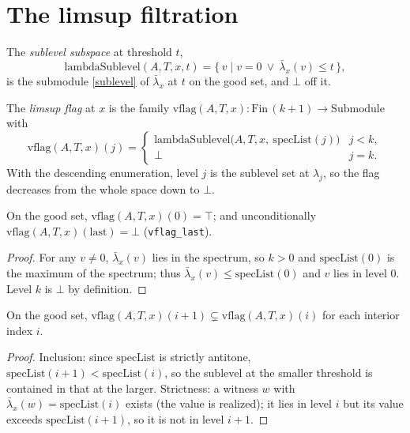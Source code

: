 \section{The limsup filtration}

\begin{definition}\label{lambdaSublevel}
  \leanok
  The \emph{sublevel subspace} at threshold $t$,
  \[ \mathrm{lambdaSublevel}(A,T,x,t)
     = \{\, v \mid v=0 \ \lor\ \bar\lambda_x(v)\le t \,\}, \]
  is the submodule \ref{sublevel} of $\bar\lambda_x$ at $t$ on the good set, and
  $\bot$ off it.
\end{definition}

\begin{definition}\label{vflag}
  \leanok
  The \emph{limsup flag} at $x$ is the family
  $\mathrm{vflag}(A,T,x)\colon\mathrm{Fin}\,(k+1)\to\mathrm{Submodule}$ with
  \[ \mathrm{vflag}(A,T,x)(j)
     = \begin{cases}
        \mathrm{lambdaSublevel}\bigl(A,T,x,\ \mathrm{specList}(j)\bigr) & j<k,\\
        \bot & j=k.
       \end{cases} \]
  With the descending enumeration, level $j$ is the sublevel set at $\lambda_j$,
  so the flag decreases from the whole space down to $\bot$.
\end{definition}

\begin{lemma}\label{vflag_zero}
  \leanok
  On the good set, $\mathrm{vflag}(A,T,x)(0)=\top$; and unconditionally
  $\mathrm{vflag}(A,T,x)(\mathrm{last})=\bot$ (\texttt{vflag\_last}).
  \begin{proof}\leanok
  For any $v\neq 0$, $\bar\lambda_x(v)$ lies in the spectrum, so $k>0$ and
  $\mathrm{specList}(0)$ is the maximum of the spectrum; thus
  $\bar\lambda_x(v)\le\mathrm{specList}(0)$ and $v$ lies in level $0$. Level $k$
  is $\bot$ by definition.
  \end{proof}
\end{lemma}

\begin{theorem}\label{vflag_strictAnti}
  \leanok
  On the good set, $\mathrm{vflag}(A,T,x)(i{+}1) \subsetneq
  \mathrm{vflag}(A,T,x)(i)$ for each interior index $i$.
  \begin{proof}\leanok
  Inclusion: since $\mathrm{specList}$ is strictly antitone,
  $\mathrm{specList}(i{+}1)<\mathrm{specList}(i)$, so the sublevel at the smaller
  threshold is contained in that at the larger. Strictness: a witness $w$ with
  $\bar\lambda_x(w)=\mathrm{specList}(i)$ exists (the value is realized); it lies
  in level $i$ but its value exceeds $\mathrm{specList}(i{+}1)$, so it is not in
  level $i{+}1$.
  \end{proof}
\end{theorem}

